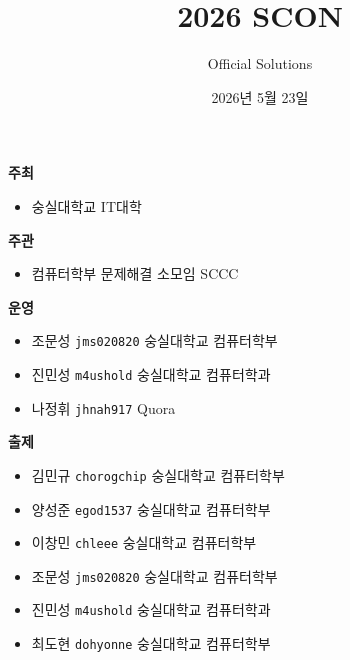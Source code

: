 
\usetikzlibrary{arrows.meta,matrix,decorations.pathreplacing}

\title{2026 SCON}
\subtitle{}
\author{Official Solutions}
\date{2026년 5월 23일}


    \setcounter{framenumber}{-1}
    \frame{\titlepage}

    \begin{frame} %
        \textbf{주최} %
        \begin{itemize}
            \item 숭실대학교 IT대학
        \end{itemize}
        \vspace{3mm}
        \textbf{주관} %
        \begin{itemize}
            \item 컴퓨터학부 문제해결 소모임 SCCC
        \end{itemize}
        \vspace{3mm}
        \textbf{운영} %
        \begin{itemize}
            \item 조문성 \tabto{1.2cm} \texttt{jms020820} \tabto{8cm} {\color{gray} 숭실대학교 컴퓨터학부}
            \item 진민성 \tabto{1.2cm} \texttt{m4ushold} \tabto{8cm} {\color{gray} 숭실대학교 컴퓨터학과}
            \item 나정휘 \tabto{1.2cm} \texttt{jhnah917} \tabto{8cm} {\color{gray} Quora}
        \end{itemize}
    \end{frame}
    
    \begin{frame}
        \textbf{출제} %
        \begin{itemize}
            \item 김민규 \tabto{1.2cm} \texttt{chorogchip} \tabto{8cm} {\color{gray} 숭실대학교 컴퓨터학부}
            \item 양성준 \tabto{1.2cm} \texttt{egod1537} \tabto{8cm} {\color{gray} 숭실대학교 컴퓨터학부}
            \item 이창민 \tabto{1.2cm} \texttt{chleee} \tabto{8cm} {\color{gray} 숭실대학교 컴퓨터학부}
            \item 조문성 \tabto{1.2cm} \texttt{jms020820} \tabto{8cm} {\color{gray} 숭실대학교 컴퓨터학부}
            \item 진민성 \tabto{1.2cm} \texttt{m4ushold} \tabto{8cm} {\color{gray} 숭실대학교 컴퓨터학과}
            \item 최도현 \tabto{1.2cm} \texttt{dohyonne} \tabto{8cm} {\color{gray} 숭실대학교 컴퓨터학부}
        \end{itemize}
    \end{frame}

